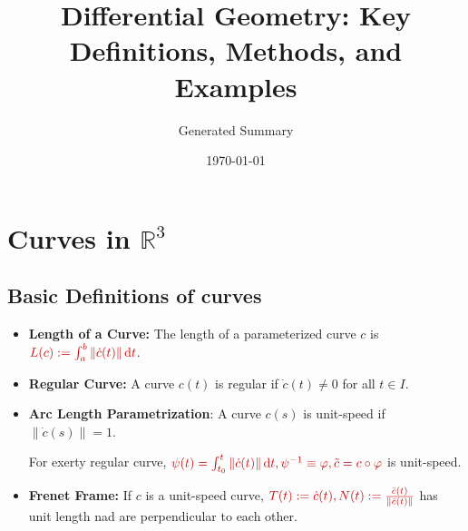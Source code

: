 \documentclass[a4paper,12pt]{article}
\title{\textbf{Differential Geometry: Key Definitions, Methods, and Examples}}
\author{Generated Summary}
\date{\today}
\newcommand{\key}[1]{\textcolor{keywordcolor}{\textbf{#1}}}
\newcommand{\formula}[1]{\textcolor{formulacolor}{#1}}
\renewcommand{\d}{\mathop{}\!\mathrm{d}}
\begin{document}
\maketitle
\tableofcontents
\newpage

\section{Curves in $\mathbb{R}^3$}

\subsection{Basic Definitions of curves}

\begin{itemize}
    \item \key{Length of a Curve:} The length of a parameterized curve $c$ is $\formula{L(c):=\int_a^b\|\dot{c}(t)\|\d t}$.
    \item \key{Regular Curve:} A curve $c(t)$ is regular if $\dot{c}(t) \neq 0$ for all $t\in I$.
    \item \key{Arc Length Parametrization}: A curve $c(s)$ is unit-speed if $\|\dot{c}(s)\| = 1$.\par
    For exerty regular curve, $\formula{\psi(t)=\int_{t_0}^t\|\dot{c}(t)\|\d t,\psi^{-1}\equiv \varphi,\tilde{c}=c\circ\varphi}$ is unit-speed.
    \item \key{Frenet Frame:} If $c$ is a unit-speed curve, $\formula{T(t):=\dot{c}(t),N(t):=\frac{\ddot{c}(t)}{\|\ddot{c}(t)\|}}$ has unit length nad are perpendicular to each other.
\end{itemize}
\end{document}
